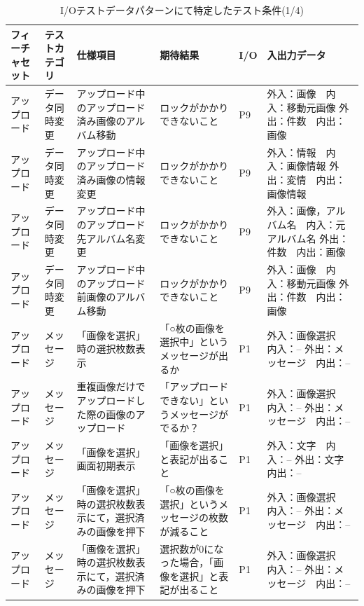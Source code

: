 \begin{table}[htbp]
  \scriptsize
  \centering
  \caption{I/Oテストデータパターンにて特定したテスト条件(1/4)}
    \begin{tabular}{|p{8em}|p{7em}|p{9em}|p{9em}|p{3em}|p{12em}|}
\cline{1-6}   フィーチャセット & テストカテゴリ  & 仕様項目 & 期待結果  & I/O   & 入出力データ \bigstrut\\
    \hline
    アップロード & データ同時変更 & アップロード中のアップロード済み画像のアルバム移動 & ロックがかかりできないこと & P9    & 外入：画像　内入：移動元画像
外出：件数　内出：画像 \bigstrut\\
    \hline
    アップロード & データ同時変更 & アップロード中のアップロード済み画像の情報変更 & ロックがかかりできないこと & P9    & 外入：情報　内入：画像情報
外出：変情　内出：画像情報 \bigstrut\\
    \hline
    アップロード & データ同時変更 & アップロード中のアップロード先アルバム名変更 & ロックがかかりできないこと & P9    & 外入：画像，アルバム名　内入：元アルバム名
外出：件数　内出：画像 \bigstrut\\
    \hline
    アップロード & データ同時変更 & アップロード中のアップロード前画像のアルバム移動 & ロックがかかりできないこと & P9    & 外入：画像　内入：移動元画像
外出：件数　内出：画像 \bigstrut\\
    \hline
    アップロード & メッセージ & 「画像を選択」時の選択枚数表示 & 「○枚の画像を選択中」というメッセージが出るか & P1    & 外入：画像選択　内入：--
外出：メッセージ　内出：-- \bigstrut\\
    \hline
    アップロード & メッセージ & 重複画像だけでアップロードした際の画像のアップロード & 「アップロードできない」というメッセージがでるか？ & P1    & 外入：画像選択　内入：--
外出：メッセージ　内出：-- \bigstrut\\
    \hline
    アップロード & メッセージ & 「画像を選択」画面初期表示 & 「画像を選択」と表記が出ること & P1    & 外入：文字　内入：--
外出：文字　内出：-- \bigstrut\\
    \hline
    アップロード & メッセージ & 「画像を選択」時の選択枚数表示にて，選択済みの画像を押下 & 「○枚の画像を選択」というメッセージの枚数が減ること & P1    & 外入：画像選択　内入：--
外出：メッセージ　内出：-- \bigstrut\\
    \hline
    アップロード & メッセージ & 「画像を選択」時の選択枚数表示にて，選択済みの画像を押下 & 選択数が0になった場合，「画像を選択」と表記が出ること & P1    & 外入：画像選択　内入：--
外出：メッセージ　内出：-- \bigstrut\\

\end{tabular}
\end{table}
